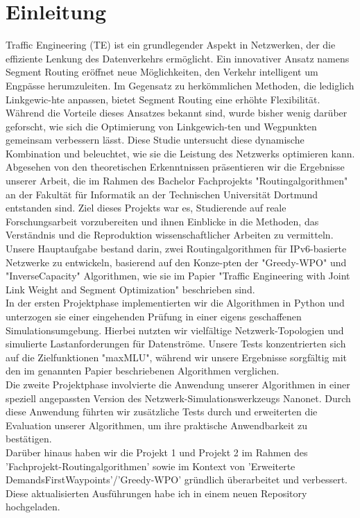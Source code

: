 \documentclass[sigconf, nonacm, review]{acmart}
\begin{document}
\section{Einleitung}
Traffic Engineering (TE) ist ein grundlegender Aspekt in Netzwerken, der die effiziente Lenkung des Datenverkehrs ermöglicht. Ein innovativer Ansatz namens Segment Routing eröffnet neue Möglichkeiten, den Verkehr intelligent um Engpässe herumzuleiten. Im Gegensatz zu herkömmlichen Methoden, die lediglich Linkgewic-hte anpassen, bietet Segment Routing eine erhöhte Flexibilität. Während die Vorteile dieses Ansatzes bekannt sind, wurde bisher wenig darüber geforscht, wie sich die Optimierung von Linkgewich-ten und Wegpunkten gemeinsam verbessern lässt. Diese Studie untersucht diese dynamische Kombination und beleuchtet, wie sie die Leistung des Netzwerks optimieren kann.\\
Abgesehen von den theoretischen Erkenntnissen präsentieren wir die Ergebnisse unserer Arbeit, die im Rahmen des Bachelor Fachprojekts "Routingalgorithmen" an der Fakultät für Informatik an der Technischen Universität Dortmund entstanden sind. Ziel dieses Projekts war es, Studierende auf reale Forschungsarbeit vorzubereiten und ihnen Einblicke in die Methoden, das Verständnis und die Reproduktion wissenschaftlicher Arbeiten zu vermitteln.\\
Unsere Hauptaufgabe bestand darin, zwei Routingalgorithmen für IPv6-basierte Netzwerke zu entwickeln, basierend auf den Konze-pten der "Greedy-WPO" und "InverseCapacity" Algorithmen, wie sie im Papier "Traffic Engineering with Joint Link Weight and Segment Optimization" \cite{foerster2021} beschrieben sind.\\
In der ersten Projektphase implementierten wir die Algorithmen in Python und unterzogen sie einer eingehenden Prüfung in einer eigens geschaffenen Simulationsumgebung. Hierbei nutzten wir vielfältige Netzwerk-Topologien und simulierte Lastanforderungen für Datenströme. Unsere Tests konzentrierten sich auf die Zielfunktionen "maxMLU", während wir unsere Ergebnisse sorgfältig mit den im genannten Papier beschriebenen Algorithmen verglichen.\\
Die zweite Projektphase involvierte die Anwendung unserer Algorithmen in einer speziell angepassten Version des Netzwerk-Simulationswerkzeugs Nanonet. Durch diese Anwendung führten wir zusätzliche Tests durch und erweiterten die Evaluation unserer Algorithmen, um ihre praktische Anwendbarkeit zu bestätigen.\\
Darüber hinaus haben wir die Projekt 1 und Projekt 2 im Rahmen des 'Fachprojekt-Routingalgorithmen' sowie im Kontext von 'Erweiterte DemandsFirstWaypoints'/'Greedy-WPO'  gründlich überarbeitet und verbessert. Diese aktualisierten Ausführungen habe ich in einem neuen Repository hochgeladen\cite{new-repo}.
\end{document}
